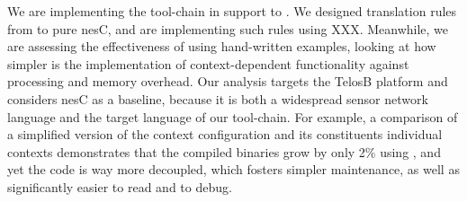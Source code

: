 We are implementing the tool-chain in support to \conesc. We designed
translation rules from \conesc to pure nesC, and are implementing such
rules using XXX. Meanwhile, we are assessing the effectiveness of
\conesc using hand-written examples, looking at how simpler is the
implementation of context-dependent functionality against processing
and memory overhead. Our analysis targets the TelosB platform and
considers nesC as a baseline, because it is both a widespread sensor
network language and the target language of our tool-chain. For
example, a comparison of a simplified version of the
{} context configuration and its constituents
individual contexts demonstrates that the compiled binaries grow by
only 2\% using \conesc, and yet the code is way more decoupled, which
fosters simpler maintenance, as well as significantly easier to read
and to debug.








